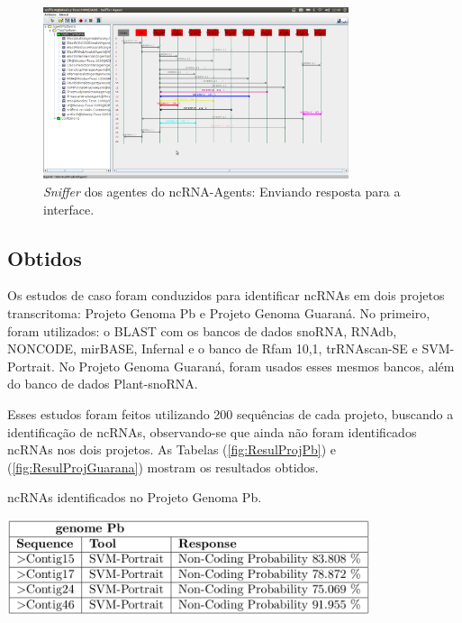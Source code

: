 \begin{figure}[htb!]
\centering
\includegraphics[angle=0,width=0.8\textwidth]{imagens//FinalExe.png}
\caption{\textit{Sniffer} dos agentes do ncRNA-Agents: Enviando resposta para a interface.\label{sec:TelaFinalExec}}
\end{figure}


\newpage
\subsection{Obtidos} \label{sec:Resulobtidos}

Os estudos de caso foram conduzidos para identificar ncRNAs em dois projetos transcritoma: Projeto Genoma Pb e Projeto Genoma Guaraná. No primeiro, foram utilizados: o BLAST com os bancos de dados snoRNA, RNAdb, NONCODE, mirBASE, Infernal e o banco de Rfam 10,1, trRNAscan-SE e SVM-Portrait. No Projeto Genoma Guaraná, foram usados esses mesmos bancos, além do banco de dados Plant-snoRNA.

Esses estudos foram feitos utilizando 200 sequências de cada projeto, buscando a identificação de ncRNAs, observando-se que ainda não foram identificados ncRNAs nos dois projetos. As Tabelas (\ref{fig:ResulProjPb}) e (\ref{fig:ResulProjGuarana}) mostram os resultados obtidos.

\begin{table}[htb!]
\caption{ncRNAs identificados no Projeto Genoma Pb.} \label{fig:ResulProjPb}
\centering
\includegraphics[angle=0,width=0.8\textwidth]{imagens//fig2.JPEG} %
\end{table}


